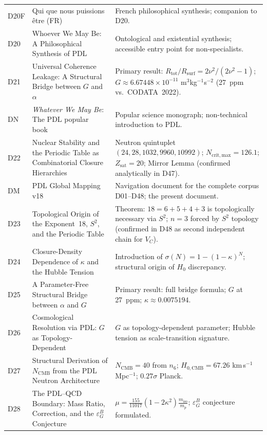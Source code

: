 \documentclass[11pt,a4paper]{article}
\theoremstyle{plain}
\theoremstyle{definition}
\theoremstyle{remark}
\newcommand{\epsGeomB}{\varepsilon_G^B}
\begin{document}
\begin{longtable}{L{1.3cm}L{3.8cm}L{8.0cm}}
D20F & Qui que nous puissions \^etre (FR)~\cite{D20F} & French philosophical synthesis; companion to D20.\\[0.3em]
D20 & Whoever We May Be: A Philosophical Synthesis of PDL~\cite{D20} & Ontological and existential synthesis; accessible entry point for non-specialists.\\[0.3em]
D21 & Universal Coherence Leakage: A Structural Bridge between $G$ and $\alpha$~\cite{D21} & \textcolor{proofblue}{Primary result}: $R_{\mathrm{tot}}/R_{\mathrm{surf}} = 2\nu^2/(2\nu^2-1)$; $G \approx 6.67448\times 10^{-11}$ m$^3$kg$^{-1}$s$^{-2}$ (27~ppm vs.\ CODATA~2022).\\[0.3em]
DN & \emph{Whatever We May Be}: The PDL popular book~\cite{DN} & Popular science monograph; non-technical introduction to PDL.\\[0.3em]
D22 & Nuclear Stability and the Periodic Table as Combinatorial Closure Hierarchies~\cite{D22} & Neutron quintuplet $(24,28,1032,9960,10992)$; $N_{\mathrm{crit,max}}=126.1$; $Z_{\mathrm{sat}}=20$; Mirror Lemma (confirmed analytically in D47).\\[0.3em]
DM & PDL Global Mapping v18~\cite{DMapv10} & Navigation document for the complete corpus D01--D48; the present document.\\[0.3em]
D23 & Topological Origin of the Exponent~18, $S^2$, and the Periodic Table~\cite{D23} & \textcolor{proofblue}{Theorem}: $18=6+5+4+3$ is topologically necessary via $S^2$; $n=3$ forced by $S^2$ topology (confirmed in D48 as second independent chain for $V_C$).\\[0.3em]
D24 & Closure-Density Dependence of $\kappa$ and the Hubble Tension~\cite{D24} & Introduction of $\sigma(N)=1-(1-\kappa)^N$; structural origin of $H_0$ discrepancy.\\[0.3em]
D25 & A Parameter-Free Structural Bridge between $\alpha$ and $G$~\cite{D25} & \textcolor{proofblue}{Primary result}: full bridge formula; $G$ at 27~ppm; $\kappa\approx 0.0075194$.\\[0.3em]
D26 & Cosmological Resolution via PDL: $G$ as Topology-Dependent~\cite{D26} & $G$ as topology-dependent parameter; Hubble tension as scale-transition signature.\\[0.3em]
D27 & Structural Derivation of $N_{\mathrm{CMB}}$ from the PDL Neutron Architecture~\cite{D27} & $N_{\mathrm{CMB}}=40$ from $n_6$; $H_{0,\mathrm{CMB}}=67.26$ km\,s$^{-1}$\,Mpc$^{-1}$; $0.27\sigma$ Planck.\\[0.3em]
D28 & The PDL--QCD Boundary: Mass Ratio, Correction, and the $\epsGeomB$ Conjecture~\cite{D28} & $\mu = \frac{155}{11017}(1-2\kappa^2)\frac{m_{\mathrm{iso}}}{m_p}$; $\epsGeomB$ conjecture formulated.\\[0.3em]

\end{longtable}
\end{document}
